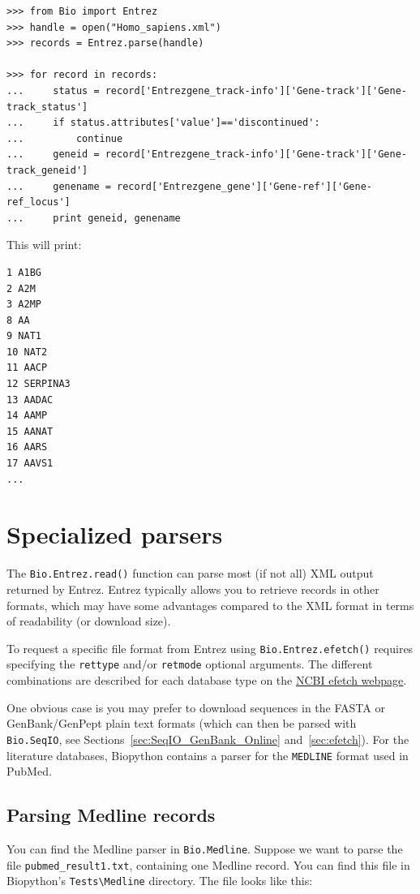 \documentclass{report}
\begin{document}
\begin{verbatim}
>>> from Bio import Entrez
>>> handle = open("Homo_sapiens.xml")
>>> records = Entrez.parse(handle)

>>> for record in records:
...     status = record['Entrezgene_track-info']['Gene-track']['Gene-track_status']
...     if status.attributes['value']=='discontinued':
...         continue
...     geneid = record['Entrezgene_track-info']['Gene-track']['Gene-track_geneid']
...     genename = record['Entrezgene_gene']['Gene-ref']['Gene-ref_locus']
...     print geneid, genename
\end{verbatim}

This will print:
\begin{verbatim}
1 A1BG
2 A2M
3 A2MP
8 AA
9 NAT1
10 NAT2
11 AACP
12 SERPINA3
13 AADAC
14 AAMP
15 AANAT
16 AARS
17 AAVS1
...
\end{verbatim}


\section{Specialized parsers}
\label{sec:entrez-specialized-parsers}

The \verb|Bio.Entrez.read()| function can parse most (if not all) XML output returned by Entrez. Entrez typically allows you to retrieve records in other formats, which may have some advantages compared to the XML format in terms of readability (or download size).

To request a specific file format from Entrez using \verb|Bio.Entrez.efetch()| requires specifying the \verb|rettype| and/or \verb|retmode| optional arguments.  The different combinations are described for each database type on the \href{http://www.ncbi.nlm.nih.gov/entrez/query/static/efetch_help.html}{NCBI efetch webpage}.

One obvious case is you may prefer to download sequences in the FASTA or GenBank/GenPept plain text formats (which can then be parsed with \verb|Bio.SeqIO|, see Sections~\ref{sec:SeqIO_GenBank_Online} and~\ref{sec:efetch}).  For the literature databases, Biopython contains a parser for the \verb+MEDLINE+ format used in PubMed.

\subsection{Parsing Medline records}
\label{subsec:entrez-and-medline}
You can find the Medline parser in \verb+Bio.Medline+. Suppose we want to parse the file \verb+pubmed_result1.txt+, containing one Medline record. You can find this file in Biopython's \verb+Tests\Medline+ directory. The file looks like this:
\end{document}
